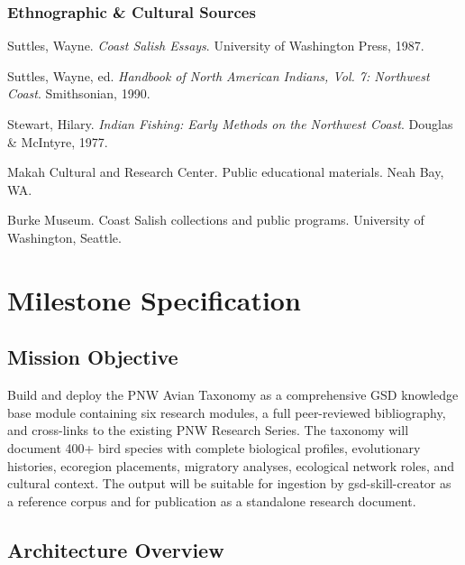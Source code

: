 \documentclass[11pt,letterpaper]{article}
\newcommand{\stageheader}[2]{%
  \noindent\colorbox{#2}{\makebox[\textwidth][l]{%
    \textcolor{white}{\bfseries\sffamily\hspace{6pt}#1\hspace{6pt}}}}%
  \vspace{0.5em}\par%
}
\begin{document}
\subsubsection{Ethnographic \& Cultural Sources}
\begin{enumerate}[leftmargin=2em, label={[C\arabic*]}]
\item Suttles, Wayne. \textit{Coast Salish Essays}. University of Washington Press, 1987.
\item Suttles, Wayne, ed. \textit{Handbook of North American Indians, Vol. 7: Northwest Coast}. Smithsonian, 1990.
\item Stewart, Hilary. \textit{Indian Fishing: Early Methods on the Northwest Coast}. Douglas \& McIntyre, 1977.
\item Makah Cultural and Research Center. Public educational materials. Neah Bay, WA.
\item Burke Museum. Coast Salish collections and public programs. University of Washington, Seattle.
\end{enumerate}

\newpage

\stageheader{STAGE 3 --- MISSION PACKAGE}{tertiary}

\section{Milestone Specification}

\subsection{Mission Objective}

Build and deploy the PNW Avian Taxonomy as a comprehensive GSD knowledge base module containing six research modules, a full peer-reviewed bibliography, and cross-links to the existing PNW Research Series. The taxonomy will document 400+ bird species with complete biological profiles, evolutionary histories, ecoregion placements, migratory analyses, ecological network roles, and cultural context. The output will be suitable for ingestion by gsd-skill-creator as a reference corpus and for publication as a standalone research document.

\subsection{Architecture Overview}
\end{document}
